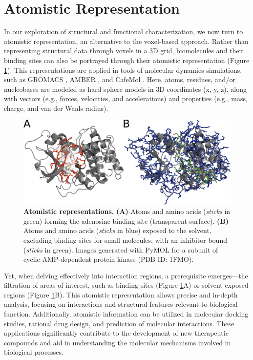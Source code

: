 \documentclass[Ingles]{phdthesis}
\def\eg{e.g.\onedot}
\begin{document}
\section{Atomistic Representation}

In our exploration of structural and functional characterization, we now turn to atomistic representation, an alternative to the voxel-based approach. Rather than representing structural data through voxels in a \acs{3D} grid, biomolecules and their binding sites can also be portrayed through their atomistic representation (Figure \ref{fig:atomistic-representation}). This representations are applied in tools of molecular dynamics simulations, such as GROMACS \cite{gromacs}, AMBER \cite{amber}, and CafeMol \cite{kenzaki2011}. Here, atoms, residues, and/or nucleobases are modeled as hard sphere models in \acs{3D} coordinates (x, y, z), along with vectors (\eg, forces, velocities, and accelerations) and properties (\eg, mass, charge, and van der Waals radius).

\begin{figure}[h]
  \centerline{\includegraphics[scale=2]{images/atomistic-representation.png}}
  \caption[Atomistic representations]{\textbf{Atomistic representations.} \textbf{(A)} Atoms and amino acids (\textit{sticks} in green) forming the adenosine binding site (transparent surface). \textbf{(B)} Atoms and amino acids (\textit{sticks} in blue) exposed to the solvent, excluding binding sites for small molecules, with an inhibitor bound (\textit{sticks} in green). Images generated with PyMOL for a subunit of cyclic AMP-dependent protein kinase (PDB ID: 1FMO).}
  \label{fig:atomistic-representation}
\end{figure}

Yet, when delving effectively into interaction regions, a prerequisite emerges---the filtration of areas of interest, such as binding sites (Figure \ref{fig:atomistic-representation}A) or solvent-exposed regions (Figure \ref{fig:atomistic-representation}B). This atomistic representation allows precise and in-depth analysis, focusing on interactions and structural features relevant to biological function. Additionally, atomistic information can be utilized in molecular docking studies, rational drug design, and prediction of molecular interactions. These applications significantly contribute to the development of new therapeutic compounds and aid in understanding the molecular mechanisms involved in biological processes.
\end{document}

